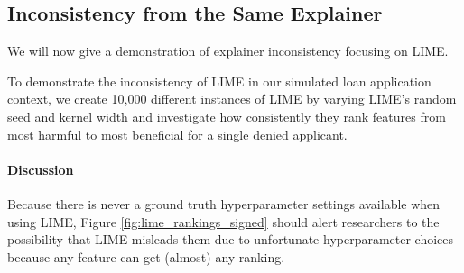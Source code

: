 \documentclass[11pt]{article}    %
\begin{document}
    \subsection{Inconsistency from the Same Explainer}
            \label{sec:conflict_within}
        We will now give a demonstration of explainer inconsistency focusing on LIME.

             To demonstrate the inconsistency of LIME in our simulated loan application context, we create 10,000 different instances of LIME by varying LIME's random seed and kernel width and investigate how consistently they rank features from most harmful to most beneficial for a single denied applicant. 

             \paragraph{Discussion}
             Because there is never a ground truth hyperparameter settings available when using LIME, Figure \ref{fig:lime_rankings_signed} should alert researchers to the possibility that LIME misleads them due to unfortunate hyperparameter choices because any feature can get (almost) any ranking. 

\end{document}

